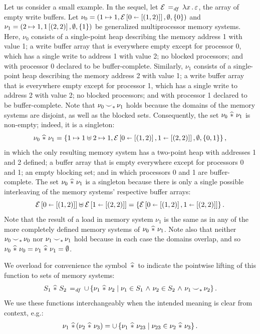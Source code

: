 \documentclass[11pt]{report}         %
\begin{document}
Let us consider a small example. In the sequel, let $\mathcal{E} \operatorname{\;=_{\mathit{df}}\;} \lambda x\,.\, \varepsilon$, the array of empty write buffers. Let $\nu_0 = (1 \mapsto 1, \mathcal{E} \left[ 0 \shortleftarrow \left[(1,2)\right] \right],\operatorname{\emptyset},\left\lbrace 0 \right\rbrace)$ and $\nu_1 = (2 \mapsto 1, 1 \left[ (2,2) \right],\operatorname{\emptyset},\left\lbrace 1 \right\rbrace)$ be generalized multiprocessor memory systems. Here, $\nu_0$ consists of a single-point heap describing the memory address 1 with value 1; a write buffer array that is everywhere empty except for processor 0, which has a single write to address 1 with value 2; no blocked processors; and with processor 0 declared to be buffer-complete. Similarly, $\nu_1$ consists of a single-point heap describing the memory address 2 with value 1; a write buffer array that is everywhere empty except for processor 1, which has a single write to address 2 with value 2; no blocked processors; and with processor 1 declared to be buffer-complete. Note that $\nu_0 \operatorname{\smile}_\ast \nu_1$ holds because the domains of the memory systems are disjoint, as well as the blocked sets. Consequently, the set $\nu_0 \operatorname{\,\widehat{\ast}\,} \nu_1$ is non-empty; indeed, it is a singleton: \[ \nu_0 \operatorname{\,\widehat{\ast}\,} \nu_1 = \left\lbrace 1 \mapsto 1 \uplus 2 \mapsto 1, \mathcal{E} \left[ 0 \shortleftarrow \left[(1,2)\right], 1 \shortleftarrow \left[(2,2)\right] \right],\operatorname{\emptyset},\left\lbrace 0,1 \right\rbrace \right\rbrace,\] in which the only resulting memory system has a two-point heap with addresses 1 and 2 defined; a buffer array that is empty everywhere except for processors 0 and 1; an empty blocking set; and in which processors 0 and 1 are buffer-complete. The set $\nu_0 \operatorname{\,\widehat{\ast}\,} \nu_1$ is a singleton because there is only a single possible interleaving of the memory systems' respective buffer arrays: \[\mathcal{E} \left[ 0 \shortleftarrow \left[(1,2)\right] \right] \uplus \mathcal{E} \left[ 1 \shortleftarrow \left[(2,2)\right] \right] = \left\lbrace  \mathcal{E} \left[ 0 \shortleftarrow \left[(1,2)\right], 1 \shortleftarrow \left[(2,2)\right] \right] \right\rbrace.\] Note that the result of a load in memory system $\nu_1$ is the same as in any of the more completely defined memory systems of $\nu_0 \operatorname{\,\widehat{\ast}\,} \nu_1$. Note also that neither $\nu_0 \operatorname{\smile}_\ast \nu_0$ nor $\nu_1 \operatorname{\smile}_\ast \nu_1$ hold because in each case the domains overlap, and so $\nu_0 \operatorname{\,\widehat{\ast}\,} \nu_0 = \nu_1 \operatorname{\,\widehat{\ast}\,} \nu_1 = \operatorname{\emptyset}$. 

We overload for convenience the symbol $\operatorname{\,\widehat{\ast}\,}$ to indicate the pointwise lifting of this function to sets of memory systems: \[ S_1 \operatorname{\,\widehat{\ast}\,} S_2 \operatorname{\;=_{\mathit{df}}\;} \cup \left\lbrace \nu_1 \operatorname{\,\widehat{\ast}\,} \nu_2 \mid \nu_1 \in S_1 \operatorname{\,\wedge\,} \nu_2 \in S_2 \operatorname{\,\wedge\,} \nu_1 \operatorname{\smile}_\ast \nu_2 \right\rbrace.\] We use these functions interchangeably when the intended meaning is clear from context, e.g.: \[ \nu_1 \operatorname{\,\widehat{\ast}\,} (\nu_2 \operatorname{\,\widehat{\ast}\,} \nu_3) = \cup \left\lbrace \nu_1 \operatorname{\,\widehat{\ast}\,} \nu_{23} \mid \nu_{23} \in \nu_2 \operatorname{\,\widehat{\ast}\,} \nu_3 \right\rbrace.\] 
\end{document}

